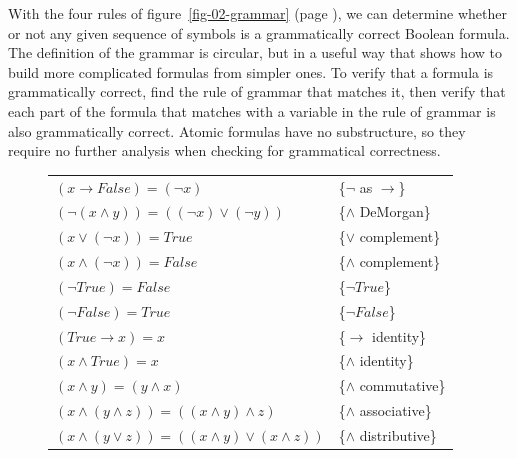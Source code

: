 With the four rules of
figure~\ref{fig-02-grammar} (page \pageref{fig-02-grammar}),
we can determine whether or not any given sequence of symbols
is a grammatically correct Boolean formula.
The definition of the grammar is circular,
but in a useful way that shows
how to build more complicated formulas from simpler ones.
To verify that a formula is grammatically correct,
find the rule of grammar that matches it,
then verify that each part of the formula
that matches with a variable in the rule of grammar
is also grammatically correct.
Atomic formulas have no substructure,
so they require no further analysis when checking for grammatical correctness.

\begin{figure}
\begin{center}
\begin{spacing}{0.9}
\begin{tabular}{ll}
$(x \rightarrow False) = (\neg x)$                                   & \{$\neg$ as $\rightarrow$\}\label{neg-as-imp} \\
$(\neg(x \wedge y)) = ((\neg x) \vee (\neg y))$                      & \{$\wedge$ DeMorgan\}      \label{and-DeMorgan} \\
$(x \vee (\neg x)) = True$                                           & \{$\vee$ complement\}      \label{or-complement} \\
$(x \wedge (\neg x)) = False$                                        & \{$\wedge$ complement\}    \label{and-complement} \\
$(\neg True) = False$                                                & \{$\neg True$\}            \label{not-True} \\
$(\neg False) = True$                                                & \{$\neg False$\}           \label{not-False} \\
$(True \rightarrow x) = x$                                           & \{$\rightarrow$ identity\} \label{imp-identity} \\
$(x \wedge True) = x$                                                & \{$\wedge$ identity\}      \label{and-identity} \\
$(x \wedge y) = (y \wedge x)$                                        & \{$\wedge$ commutative\}   \label{and-commutative} \\
$(x \wedge (y \wedge z)) = ((x \wedge y) \wedge z)$                  & \{$\wedge$ associative\}   \label{and-associative} \\
$(x \wedge (y \vee z)) = ((x \wedge y) \vee (x \wedge z))$           & \{$\wedge$ distributive\}  \label{and-distributive} \\

\end{tabular}
\end{spacing}
\end{center}
\end{figure}

